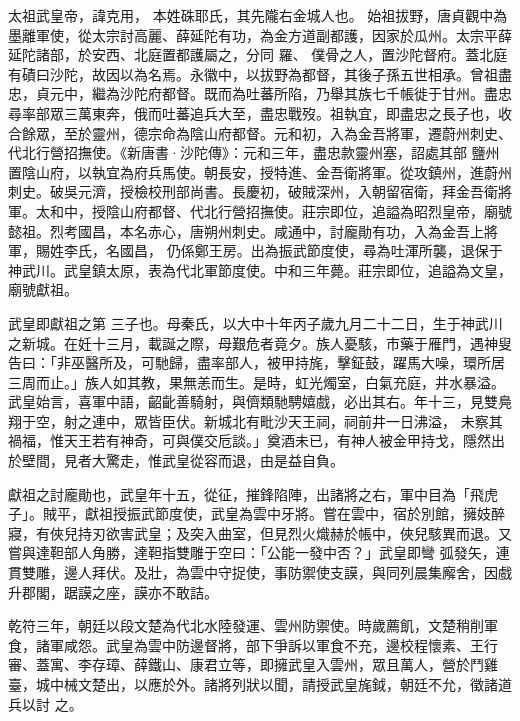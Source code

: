 
\begin{pinyinscope}
太祖武皇帝，諱克用，
 本姓硃耶氏，其先隴右金城人也。
 始祖拔野，唐貞觀中為墨離軍使，從太宗討高麗、薛延陀有功，為金方道副都護，因家於瓜州。太宗平薛延陀諸部，於安西、北庭置都護屬之，分同
 羅、
 僕骨之人，置沙陀督府。蓋北庭有磧曰沙陀，故因以為名焉。永徽中，以拔野為都督，其後子孫五世相承。曾祖盡忠，貞元中，繼為沙陀府都督。既而為吐蕃所陷，乃舉其族七千帳徙于甘州。盡忠尋率部眾三萬東奔，俄而吐蕃追兵大至，盡忠戰歿。祖執宜，即盡忠之長子也，收合餘眾，至於靈州，德宗命為陰山府都督。元和初，入為金吾將軍，遷蔚州刺史、代北行營招撫使。《新唐書·沙陀傳》：元和三年，盡忠款靈州塞，詔處其部
 鹽州置陰山府，以執宜為府兵馬使。朝長安，授特進、金吾衛將軍。從攻鎮州，進蔚州刺史。破吳元濟，授檢校刑部尚書。長慶初，破賊深州，入朝留宿衛，拜金吾衛將軍。太和中，授陰山府都督、代北行營招撫使。莊宗即位，追謚為昭烈皇帝，廟號懿祖。烈考國昌，本名赤心，唐朔州刺史。咸通中，討龐勛有功，入為金吾上將軍，賜姓李氏，名國昌，
 仍係鄭王房。出為振武節度使，尋為吐渾所襲，退保于神武川。武皇鎮太原，表為代北軍節度使。中和三年薨。莊宗即位，追謚為文皇，廟號獻祖。



 武皇即獻祖之第
 三子也。母秦氏，以大中十年丙子歲九月二十二日，生于神武川之新城。在妊十三月，載誕之際，母艱危者竟夕。族人憂駭，市藥于雁門，遇神叟告曰：「非巫醫所及，可馳歸，盡率部人，被甲持旄，擊鉦鼓，躍馬大噪，環所居三周而止。」族人如其教，果無恙而生。是時，虹光燭室，白氣充庭，井水暴溢。武皇始言，喜軍中語，齠齔善騎射，與儕類馳騁嬉戲，必出其右。年十三，見雙鳧翔于空，射之連中，眾皆臣伏。新城北有毗沙天王祠，祠前井一日沸溢，
 未察其禍福，惟天王若有神奇，可與僕交卮談。」奠酒未已，有神人被金甲持戈，隱然出於壁間，見者大驚走，惟武皇從容而退，由是益自負。



 獻祖之討龐勛也，武皇年十五，從征，摧鋒陷陣，出諸將之右，軍中目為「飛虎子」。賊平，獻祖授振武節度使，武皇為雲中牙將。嘗在雲中，宿於別館，擁妓醉寢，有俠兒持刃欲害武皇；及突入曲室，但見烈火熾赫於帳中，俠兒駭異而退。又嘗與達靼部人角勝，達靼指雙雕于空曰：「公能一發中否？」武皇即彎
 弧發矢，連貫雙雕，邊人拜伏。及壯，為雲中守捉使，事防禦使支謨，與同列晨集廨舍，因戲升郡閣，踞謨之座，謨亦不敢詰。



 乾符三年，朝廷以段文楚為代北水陸發運、雲州防禦使。時歲薦飢，文楚稍削軍食，諸軍咸怨。武皇為雲中防邊督將，部下爭訴以軍食不充，邊校程懷素、王行審、蓋寓、李存璋、薛鐵山、康君立等，即擁武皇入雲州，眾且萬人，營於鬥雞臺，城中械文楚出，以應於外。諸將列狀以聞，請授武皇旄鉞，朝廷不允，徵諸道兵以討
 之。




\end{pinyinscope}
